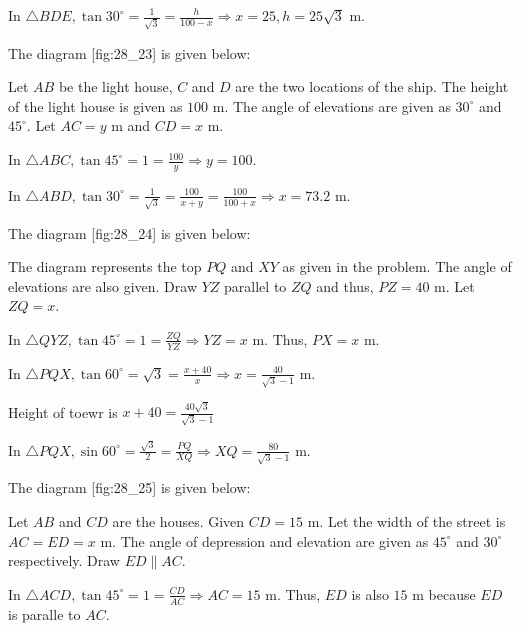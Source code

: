   In $\triangle BDE, \tan30^\circ = \frac{1}{\sqrt{3}} = \frac{h}{100 - x} \Rightarrow x = 25, h = 25\sqrt{3}$ m.

\item The diagram [fig:28_23] is given below:

  \startplacefigure[reference=fig:28_23]
    \externalfigure[28_23.pdf]
  \stopplacefigure

  Let $AB$ be the light house, $C$ and $D$ are the two locations of the ship. The height of the light house is
  given as $100$ m. The angle of elevations are given as $30^\circ$ and $45^\circ$. Let $AC = y$ m and
  $CD = x$ m.

  In $\triangle ABC, \tan45^\circ = 1 = \frac{100}{y} \Rightarrow y = 100$.

  In $\triangle ABD, \tan30^\circ = \frac{1}{\sqrt{3}} = \frac{100}{x + y} = \frac{100}{100 + x} \Rightarrow x = 73.2$ m.

\item The diagram [fig:28_24] is given below:

  \startplacefigure[reference=fig:28_24]
    \externalfigure[28_24.pdf]
  \stopplacefigure

  The diagram represents the top $PQ$ and $XY$ as given in the problem. The angle of elevations are also given. Draw
  $YZ$ parallel to $ZQ$ and thus, $PZ = 40$ m. Let $ZQ = x$.

  In $\triangle QYZ, \tan45^\circ = 1 = \frac{ZQ}{YZ} \Rightarrow YZ = x$ m. Thus, $PX = x$ m.

  In $\triangle PQX, \tan60^\circ = \sqrt{3} = \frac{x + 40}{x} \Rightarrow x = \frac{40}{\sqrt{3} - 1}$ m.

  Height of toewr is $x + 40 = \frac{40\sqrt{3}}{\sqrt{3} - 1}$

  In $\triangle PQX, \sin60^\circ = \frac{\sqrt{3}}{2} = \frac{PQ}{XQ} \Rightarrow XQ = \frac{80}{\sqrt{3} - 1}$ m.

\item The diagram [fig:28_25] is given below:

  \startplacefigure[reference=fig:28_25]
    \externalfigure[28_25.pdf]
  \stopplacefigure

  Let $AB$ and $CD$ are the houses. Given $CD = 15$ m. Let the width of the street is $AC = ED = x$ m. The
  angle of depression and elevation are given as $45^\circ$ and $30^\circ$ respectively. Draw $ED\parallel AC$.

  In $\triangle ACD, \tan45^\circ = 1 = \frac{CD}{AC} \Rightarrow AC = 15$ m. Thus, $ED$ is also $15$ m because
  $ED$ is paralle to $AC$.

